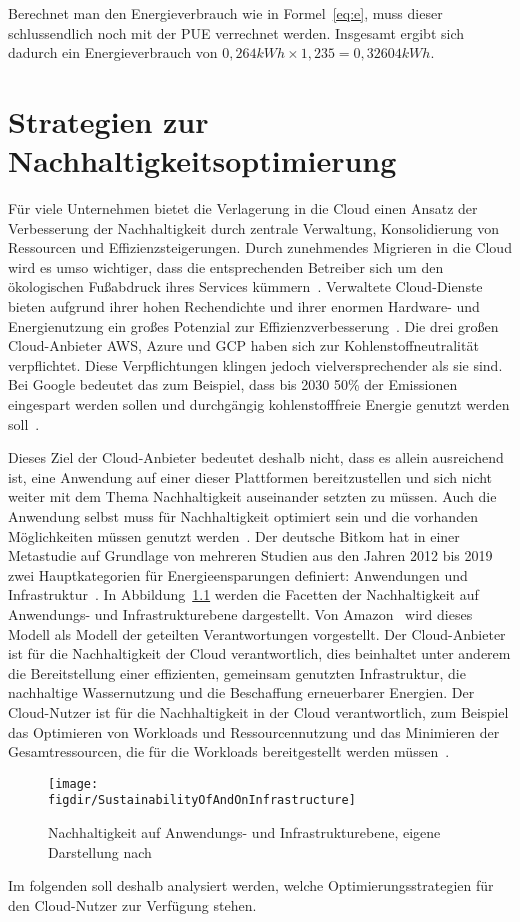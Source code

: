 Berechnet man den Energieverbrauch wie in Formel~\ref{eq:e}, muss dieser schlussendlich noch mit der \ac{PUE} verrechnet werden.
Insgesamt ergibt sich dadurch ein Energieverbrauch von $0,264 kWh \times 1,235 = 0,32604 kWh$.
\chapter{Strategien zur Nachhaltigkeitsoptimierung}\label{CAP:strategies}
\noindent Für viele Unternehmen bietet die Verlagerung in die Cloud einen Ansatz der Verbesserung der Nachhaltigkeit durch zentrale Verwaltung, Konsolidierung von Ressourcen und Effizienzsteigerungen.
Durch zunehmendes Migrieren in die Cloud wird es umso wichtiger, dass die entsprechenden Betreiber sich um den ökologischen Fußabdruck ihres Services kümmern~\cite{Buchanan.2023}.
Verwaltete Cloud-Dienste bieten aufgrund ihrer hohen Rechendichte und ihrer enormen Hardware- und Energienutzung ein großes Potenzial zur Effizienzverbesserung~\cite{Currie.2024}.
Die drei großen Cloud-Anbieter \ac{AWS}, Azure und \ac{GCP} haben sich zur Kohlenstoffneutralität verpflichtet.
Diese Verpflichtungen klingen jedoch vielversprechender als sie sind.
Bei Google bedeutet das zum Beispiel, dass bis 2030 50\% der Emissionen eingespart werden sollen und durchgängig kohlenstofffreie Energie genutzt werden soll~\cite{Google.2023}.

Dieses Ziel der Cloud-Anbieter bedeutet deshalb nicht, dass es allein ausreichend ist, eine Anwendung auf einer dieser Plattformen bereitzustellen und sich nicht weiter mit dem Thema Nachhaltigkeit auseinander setzten zu müssen.
Auch die Anwendung selbst muss für Nachhaltigkeit optimiert sein und die vorhanden Möglichkeiten müssen genutzt werden~\cite{Newman.2023}.
Der deutsche Bitkom hat in einer Metastudie auf Grundlage von mehreren Studien aus den Jahren 2012 bis 2019 zwei Hauptkategorien für Energieensparungen definiert: Anwendungen und Infrastruktur~\cite{Bieser.2020}.
In Abbildung~\ref{FIG:sustainability-infrastructure} werden die Facetten der Nachhaltigkeit auf Anwendungs- und Infrastrukturebene dargestellt.
Von Amazon~\cite{Mokhtari.2023} wird dieses Modell als Modell der geteilten Verantwortungen vorgestellt.
Der Cloud-Anbieter ist für die Nachhaltigkeit der Cloud verantwortlich, dies beinhaltet unter anderem die Bereitstellung einer effizienten, gemeinsam genutzten Infrastruktur, die nachhaltige Wassernutzung und die Beschaffung erneuerbarer Energien.
Der Cloud-Nutzer ist für die Nachhaltigkeit in der Cloud verantwortlich, zum Beispiel das Optimieren von Workloads und Ressourcennutzung und das Minimieren der Gesamtressourcen, die für die Workloads bereitgestellt werden müssen~\cite{Mokhtari.2023}.
\begin{figure}
 \caption[Nachhaltigkeit auf Anwendungs- und Infrastrukturebene]{Nachhaltigkeit auf Anwendungs- und Infrastrukturebene, eigene Darstellung nach~\cite{Mokhtari.2023}}
 {\texttt{[image: \\figdir/SustainabilityOfAndOnInfrastructure]}}
 \label{FIG:sustainability-infrastructure}
\end{figure}
Im folgenden soll deshalb analysiert werden, welche Optimierungsstrategien für den Cloud-Nutzer zur Verfügung stehen.

